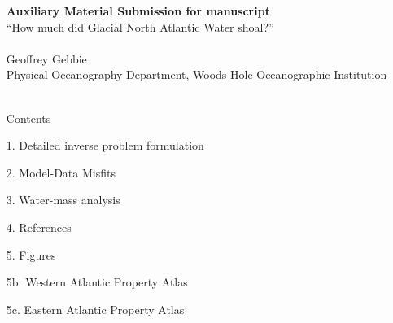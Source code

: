 \documentclass[agums]{aguplus}  %
\begin{document}







\begin{itemize}
 \item[] {\bf Auxiliary Material Submission for manuscript} \\
  ``How much did Glacial North Atlantic Water shoal?'' \\ \\
Geoffrey Gebbie \\
Physical Oceanography Department, Woods
Hole Oceanographic Institution \\ \\

\item[]    Contents 

\item[1.] Detailed inverse problem formulation

\item[2.] Model-Data Misfits

\item[3.] Water-mass analysis

\item[4.] References

\item[5.] Figures

\item[5b.] Western Atlantic Property Atlas

\item[5c.] Eastern Atlantic Property Atlas





 \end{itemize}

\end{document}
